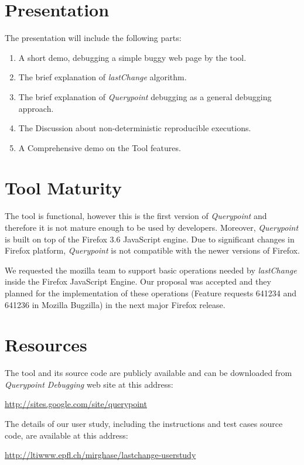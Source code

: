 \documentclass{sig-alternate}
\begin{document}
%
%

\appendix
\section{Presentation}
The presentation will include the following parts:
\begin{enumerate}
	\item A short demo, debugging a simple buggy web page by the tool.
	\item The brief explanation of \textit{lastChange} algorithm.
	\item The brief explanation of \textit{Querypoint} debugging as a general debugging approach.
	\item The Discussion about non-deterministic reproducible executions.
	\item A Comprehensive demo on the Tool features.
\end{enumerate}

\section{Tool Maturity}
The tool is functional, however this is the first version of \textit{Querypoint} and therefore it is 
not mature enough to be used by developers. Moreover, \textit{Querypoint} is built on top of the 
Firefox 3.6 JavaScript engine. Due to significant changes in Firefox platform, \textit{Querypoint} is 
not compatible with the newer versions of Firefox. 

We requested the mozilla team to support basic operations needed by \textit{lastChange} inside the 
Firefox JavaScript Engine. Our proposal was accepted and they planned for the implementation of 
these operations (Feature requests 641234 and 641236 in Mozilla Bugzilla) in the next major Firefox release.


\section{Resources}
The tool and its source code are publicly available and can be downloaded 
from \textit{Querypoint Debugging} web site at this address:

\mbox{\href{http://sites.google.com/site/querypoint}{http://sites.google.com/site/querypoint}}

The details of our user study, including the instructions and test cases source code, are available at this address:

\mbox{\href{http://ltiwww.epfl.ch/~mirghase/lastchange-userstudy}{http://ltiwww.epfl.ch/\texttildelow mirghase/lastchange-userstudy}}
\end{document}
